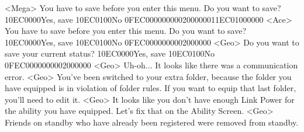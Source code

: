 <Mega> You have to save before you enter this menu. Do you want to save? {10}{EC}{00}{00}Yes, save {10}{EC}{01}{00}No {0F}{EC}{00}{00}{00}{00}{02}{00}{00}{00}{11}{EC}{01}{00}{00}{00}
<Ace> You have to save before you enter this menu. Do you want to save? {10}{EC}{00}{00}Yes, save {10}{EC}{01}{00}No {0F}{EC}{00}{00}{00}{00}{02}{00}{00}{00}
<Geo> Do you want to save your current status? {10}{EC}{00}{00}Yes, save {10}{EC}{01}{00}No {0F}{EC}{00}{00}{00}{00}{02}{00}{00}{00}
<Geo> Uh-oh... It looks like there was a communication error. 
<Geo> You've been switched to your extra folder, because the folder 
you have equipped is in violation of folder rules. If you want to 
equip that last folder, you'll need to edit it. 
<Geo> It looks like you don't have enough Link Power for the ability you have 
equipped. Let's fix that on the Ability Screen. 
<Geo> Friends on standby who have already been registered were removed from standby. 
